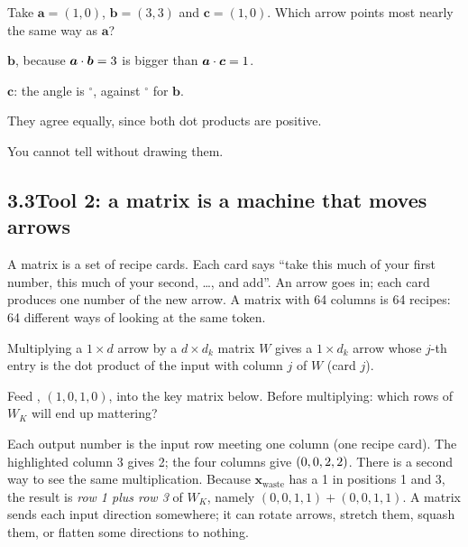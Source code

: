 \begin{checkq}
Take $\bm{a}=(1,0)$, $\bm{b}=(3,3)$ and $\bm{c}=(1,0)$. Which arrow points most nearly the same way as $\bm{a}$?
\begin{options}
\item $\bm{b}$, because $\bm{a}\cdot\bm{b}=3$ is bigger than $\bm{a}\cdot\bm{c}=1$.
\item $\bm{c}$: the angle is \nThreeQcAng$^\circ$, against \nThreeQbAng$^\circ$ for $\bm{b}$.
\item They agree equally, since both dot products are positive.
\item You cannot tell without drawing them.
\end{options}
\end{checkq}


\subsection*{3.3\quad Tool 2: a matrix is a machine that moves arrows}

\Picture A matrix is a set of recipe cards. Each card says ``take this much of your first number, this much of
your second, \ldots, and add''. An arrow goes in; each card produces one number of the new arrow. A matrix with
64 columns is 64 recipes: 64 different ways of looking at the same token.

\Exactly Multiplying a $1\times d$ arrow by a $d\times d_k$ matrix $W$ gives a $1\times d_k$ arrow whose $j$-th
entry is the dot product of the input with column $j$ of $W$ (card $j$).

\Predict Feed , $(1,0,1,0)$, into the key matrix below. Before multiplying: which rows of $W_K$ will
end up mattering?
\begin{center}\end{center}
Each output number is the input row meeting one column (one recipe card). The highlighted column 3 gives 2; the
four columns give $(0, 0, 2, 2)$. There is a second way to see the same multiplication. Because $\bm{x}_{\text{waste}}$ has a 1 in positions 1 and 3,
the result is \emph{row 1 plus row 3} of $W_K$, namely $(0,0,1,1)+(0,0,1,1)$. A matrix sends each input direction
somewhere; it can rotate arrows, stretch them, squash them, or flatten some directions to nothing.

